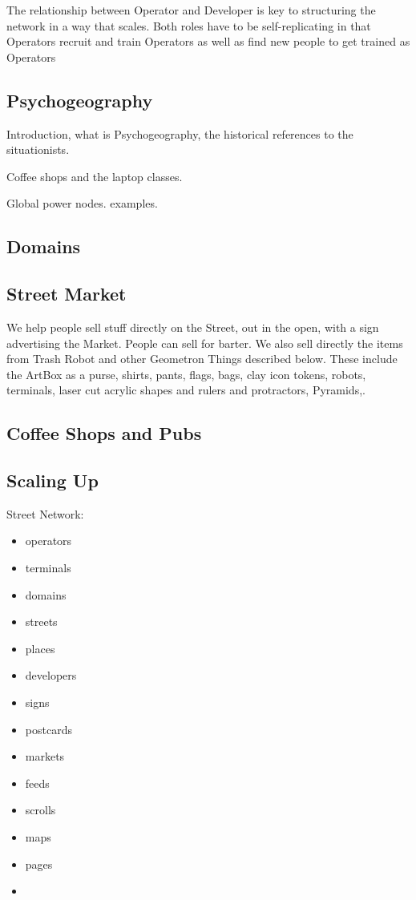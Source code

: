 The relationship between Operator and Developer is key to structuring the network in a way that scales.  Both roles have to be self-replicating in that Operators recruit and train Operators as well as find new people to get trained as Operators


\subsection{Psychogeography}

Introduction, what is Psychogeography, the historical references to the situationists.  

Coffee shops and the laptop classes.

Global power nodes. examples.



\subsection{Domains}
\subsection{Street Market}
We help people sell stuff directly on the Street, out in the open, with a sign advertising the Market.  People can sell for barter.  We also sell directly the items from Trash Robot and other Geometron Things described below.  These include the ArtBox as a purse, shirts, pants, flags, bags, clay icon tokens, robots, terminals, laser cut acrylic shapes and rulers and protractors, Pyramids,.
\subsection{Coffee Shops and Pubs}



\subsection{Scaling Up}


Street Network:

\begin{itemize}
  \tightlist
  \item
  operators  
  \item
  terminals
  \item
  domains
  \item
  streets
  \item
  places
  \item
  developers
  \item
  signs
  \item 
  postcards
  \item
  markets
  \item
  feeds
  \item
  scrolls
  \item
  maps
  \item
  pages
  \item  
\end{itemize}






